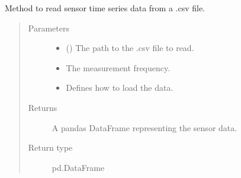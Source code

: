 \documentclass[letterpaper,10pt,english]{sphinxmanual}
\begin{document}

\begin{fulllineitems}
\label{\detokenize{anoog.io:anoog.io.csv_io.read_csv}}
\sphinxAtStartPar
Method to read sensor time series data from a .csv file.
\begin{quote}\begin{description}
\item[{Parameters}] \leavevmode\begin{itemize}
\item {} 
\sphinxAtStartPar
{} ({\hyperref[\detokenize{anoog.io:anoog.io.csv_io.loadData_mode}]{}}) \textendash{} The path to the .csv file to read.

\item {} 
\sphinxAtStartPar
{} \textendash{} The measurement frequency.

\item {} 
\sphinxAtStartPar
{} \textendash{} Defines how to load the data.

\end{itemize}

\item[{Returns}] \leavevmode
\sphinxAtStartPar
A pandas DataFrame representing the sensor data.

\item[{Return type}] \leavevmode
\sphinxAtStartPar
pd.DataFrame

\end{description}\end{quote}

\end{fulllineitems}

\end{document}
